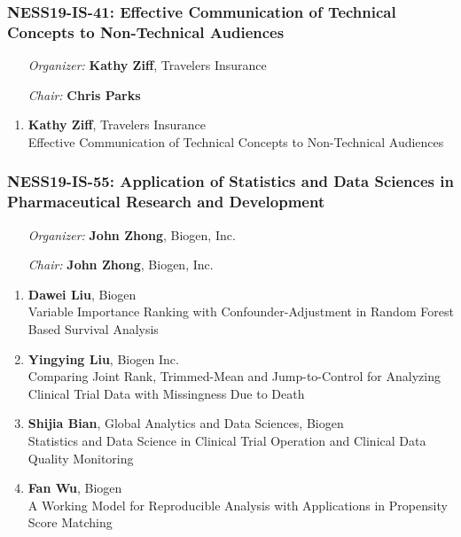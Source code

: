 \subsubsection*{NESS19-IS-41: Effective Communication of Technical Concepts to Non-Technical Audiences}

\begin{enumerate}[align=left]
\item [\emph{Organizer:}] \textbf{Kathy Ziff}, Travelers Insurance \\
\item [\emph{Chair:}] \textbf{Chris Parks}
\end{enumerate}

\begin{enumerate}
\item \textbf{Kathy Ziff}, Travelers Insurance \\
Effective Communication of Technical Concepts to Non-Technical Audiences
\end{enumerate}

\subsubsection*{NESS19-IS-55: Application of Statistics and Data Sciences in Pharmaceutical Research and Development}

\begin{enumerate}[align=left]
\item [\emph{Organizer:}] \textbf{John Zhong}, Biogen, Inc. \\
\item [\emph{Chair:}] \textbf{John Zhong}, Biogen, Inc.
\end{enumerate}

\begin{enumerate}
\item \textbf{Dawei Liu}, Biogen \\
Variable Importance Ranking with Confounder-Adjustment in Random Forest Based Survival Analysis
\item \textbf{Yingying Liu}, Biogen Inc. \\
Comparing Joint Rank, Trimmed-Mean and Jump-to-Control for Analyzing Clinical Trial Data with Missingness Due to Death
\item \textbf{Shijia Bian}, Global Analytics and Data Sciences, Biogen \\
Statistics and Data Science in Clinical Trial Operation and Clinical Data Quality Monitoring
\item \textbf{Fan Wu}, Biogen \\
A Working Model for Reproducible Analysis with Applications in Propensity Score Matching
\end{enumerate}

